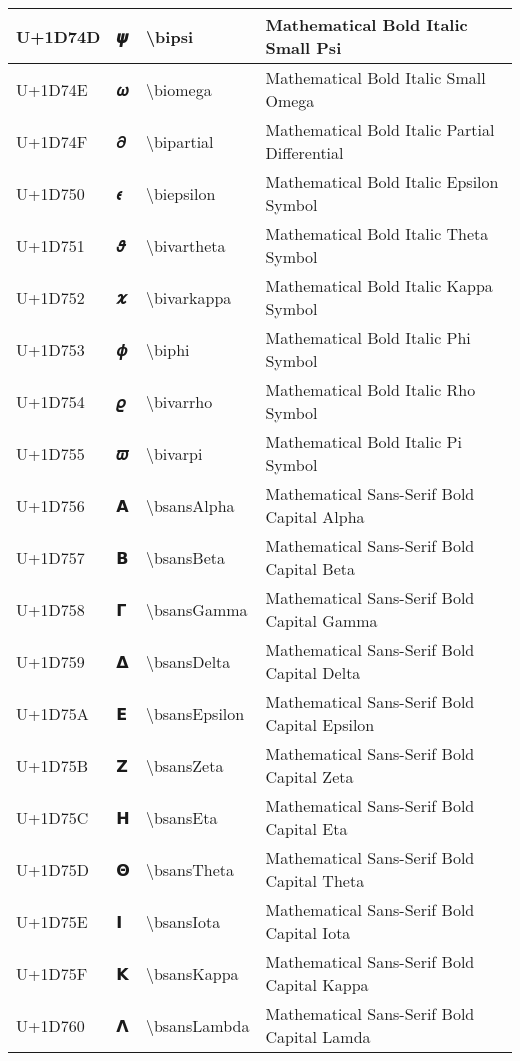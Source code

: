 \begin{table}[h]
\begin{tabulary}{\linewidth}{|L|L|L|L|}
\hline
U+1D74D & 𝝍 & {\textbackslash}bipsi & Mathematical Bold Italic Small Psi \\
\hline
U+1D74E & 𝝎 & {\textbackslash}biomega & Mathematical Bold Italic Small Omega \\
\hline
U+1D74F & 𝝏 & {\textbackslash}bipartial & Mathematical Bold Italic Partial Differential \\
\hline
U+1D750 & 𝝐 & {\textbackslash}biepsilon & Mathematical Bold Italic Epsilon Symbol \\
\hline
U+1D751 & 𝝑 & {\textbackslash}bivartheta & Mathematical Bold Italic Theta Symbol \\
\hline
U+1D752 & 𝝒 & {\textbackslash}bivarkappa & Mathematical Bold Italic Kappa Symbol \\
\hline
U+1D753 & 𝝓 & {\textbackslash}biphi & Mathematical Bold Italic Phi Symbol \\
\hline
U+1D754 & 𝝔 & {\textbackslash}bivarrho & Mathematical Bold Italic Rho Symbol \\
\hline
U+1D755 & 𝝕 & {\textbackslash}bivarpi & Mathematical Bold Italic Pi Symbol \\
\hline
U+1D756 & 𝝖 & {\textbackslash}bsansAlpha & Mathematical Sans-Serif Bold Capital Alpha \\
\hline
U+1D757 & 𝝗 & {\textbackslash}bsansBeta & Mathematical Sans-Serif Bold Capital Beta \\
\hline
U+1D758 & 𝝘 & {\textbackslash}bsansGamma & Mathematical Sans-Serif Bold Capital Gamma \\
\hline
U+1D759 & 𝝙 & {\textbackslash}bsansDelta & Mathematical Sans-Serif Bold Capital Delta \\
\hline
U+1D75A & 𝝚 & {\textbackslash}bsansEpsilon & Mathematical Sans-Serif Bold Capital Epsilon \\
\hline
U+1D75B & 𝝛 & {\textbackslash}bsansZeta & Mathematical Sans-Serif Bold Capital Zeta \\
\hline
U+1D75C & 𝝜 & {\textbackslash}bsansEta & Mathematical Sans-Serif Bold Capital Eta \\
\hline
U+1D75D & 𝝝 & {\textbackslash}bsansTheta & Mathematical Sans-Serif Bold Capital Theta \\
\hline
U+1D75E & 𝝞 & {\textbackslash}bsansIota & Mathematical Sans-Serif Bold Capital Iota \\
\hline
U+1D75F & 𝝟 & {\textbackslash}bsansKappa & Mathematical Sans-Serif Bold Capital Kappa \\
\hline
U+1D760 & 𝝠 & {\textbackslash}bsansLambda & Mathematical Sans-Serif Bold Capital Lamda \\

\end{tabulary}
\end{table}
